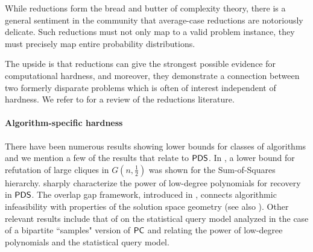 \documentclass[final,12pt]{colt2023} %
\newcommand\1[1]{\mathbb{I}_{\left\{#1\right\}}}
\begin{document}
While reductions form the bread and butter of complexity theory, there is a general sentiment in the community that average-case reductions are notoriously delicate. Such reductions must not only map to a valid problem instance, they must precisely map entire probability distributions. 

The upside is that reductions can give the strongest possible evidence for computational hardness, and moreover, they demonstrate a connection between two formerly disparate problems which is often of interest independent of hardness. We refer to \cite{BB20} for a review of the reductions literature. 




\paragraph{Algorithm-specific hardness} There have been numerous results showing lower bounds for classes of algorithms and we mention a few of the results that relate to $\mathsf{PDS}$. In \cite{BHK16}, a lower bound for refutation of large cliques 
in $G(n, \frac{1}{2})$ was shown for the Sum-of-Squares hierarchy. \cite{SchrammWein, 1v2Hard} sharply characterize the power of low-degree polynomials for recovery in $\mathsf{PDS}$. 
The overlap gap framework, introduced in \cite{gamarnik2014limits}, connects algorithmic infeasibility with properties of the solution space geometry (see also \cite{OGP,gamarnik2019landscape}). Other relevant results include that of \cite{feldman2017statistical} on the statistical query model analyzed in the case of a bipartite ``samples" version of $\mathsf{PC}$ and \cite{brennan2021statistical} relating the power of low-degree polynomials and the statistical query model. 
\end{document}
